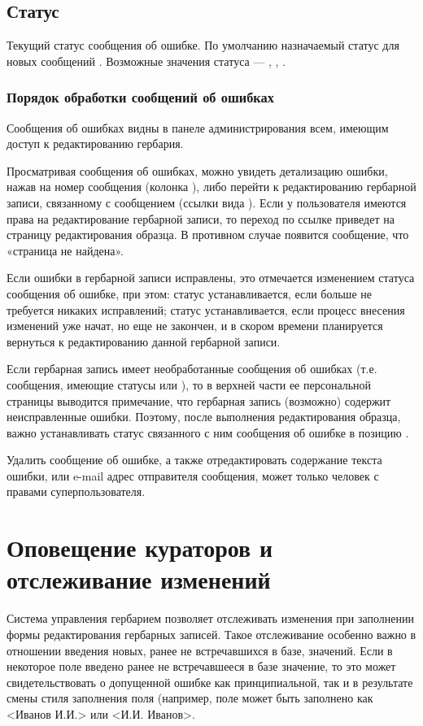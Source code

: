 \documentclass[letterpaper,10pt,russian]{sphinxmanual}
\begin{document}
\subsection{Статус}
\label{\detokenize{main:id54}}
Текущий статус сообщения об ошибке. По умолчанию назначаемый статус для
новых сообщений \textendash{} . Возможные значения статуса
— , , .


\subsubsection{Порядок обработки сообщений об ошибках}
\label{\detokenize{main:id55}}
Сообщения об ошибках видны в панеле администрирования всем,
имеющим доступ к редактированию гербария.

Просматривая сообщения об ошибках, можно увидеть
детализацию ошибки, нажав на номер
сообщения (колонка ), либо перейти к редактированию
гербарной записи, связанному
с сообщением (ссылки вида ).
Если у пользователя имеются
права на редактирование гербарной записи,
то переход по ссылке приведет на страницу редактирования образца.
В противном случае появится сообщение, что «страница не найдена».

Если ошибки в гербарной записи исправлены, это отмечается изменением
статуса сообщения об ошибке, при этом: статус  устанавливается,
если больше не требуется никаких исправлений; статус
 \textendash{}  устанавливается, если процесс внесения изменений
уже начат, но еще не закончен, и в скором времени планируется вернуться
к редактированию данной гербарной записи.

Если гербарная запись имеет необработанные сообщения об ошибках
(т.е. сообщения, имеющие статусы  или ),
то в верхней части ее персональной страницы выводится примечание, что
гербарная запись (возможно) содержит неисправленные ошибки.
Поэтому, после выполнения редактирования образца,
важно устанавливать статус связанного с ним сообщения об
ошибке в позицию .

Удалить сообщение об ошибке, а также отредактировать
содержание текста ошибки, или e-mail адрес отправителя сообщения,
может только человек с правами суперпользователя.


\section{Оповещение кураторов и отслеживание изменений}
\label{\detokenize{main:id56}}
Система управления гербарием позволяет отслеживать изменения при заполнении
формы редактирования гербарных записей. Такое отслеживание
особенно важно в отношении введения новых, ранее не встречавшихся в базе, значений.
Если в некоторое поле введено ранее не встречавшееся в базе значение,
то это может свидетельствовать о допущенной ошибке как принципиальной,
так и в результате смены стиля заполнения поля (например, поле может быть
заполнено как \textless{}Иванов И.И.\textgreater{} или \textless{}И.И. Иванов\textgreater{}.
\end{document}
